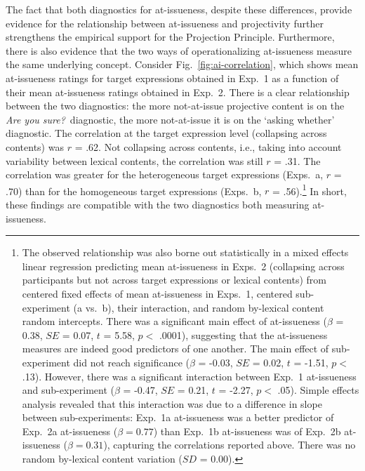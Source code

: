 \documentclass[11pt,fleqn]{article}
\newcommand{\6}{\mbox{$[\hspace*{-.6mm}[$}}
\newcommand{\9}{\mbox{$]\hspace*{-.6mm}]$}}
\newcommand{\figref}[1]{Fig.~\ref{#1}}
\begin{document}
The fact that both diagnostics for at-issueness, despite these differences, provide evidence for the relationship between at-issueness and projectivity  further strengthens the empirical support for the Projection Principle. Furthermore, there is also evidence that the two ways of operationalizing at-issueness measure the same underlying concept. Consider \figref{fig:ai-correlation}, which shows mean at-issueness ratings for target expressions obtained in Exp.~1 as a function of their mean at-issueness ratings obtained in Exp.~2. There is a clear relationship between the two diagnostics: the more not-at-issue projective content is on the {\em Are you sure?}~diagnostic, the more not-at-issue it is on the `asking whether' diagnostic. The correlation at the target expression level (collapsing across contents) was $r$ = .62. Not collapsing across contents, i.e., taking into account variability between lexical contents, the correlation was still $r$ = .31. The correlation was greater for the heterogeneous target expressions (Exps.~a, $r$ = .70) than for the homogeneous target expressions (Exps.~b, $r$ = .56).\footnote{The observed relationship was also borne out statistically in a mixed effects linear regression predicting mean at-issueness in Exps.~2 (collapsing across participants but not across target expressions or lexical contents) from centered fixed effects of mean at-issueness in Exps.~1, centered sub-experiment (a vs.~b), their interaction, and random by-lexical content random intercepts. There was a significant main effect of at-issueness ($\beta$ = 0.38, $SE$ = 0.07, $t$ = 5.58, $p <$ .0001), suggesting that the at-issueness measures are indeed good predictors of one another. The main effect of sub-experiment did not reach significance  ($\beta$ = -0.03, $SE$ = 0.02, $t$ = -1.51, $p <$ .13). However, there was a significant interaction between Exp.~1 at-issueness and sub-experiment ($\beta$ = -0.47, $SE$ = 0.21, $t$ = -2.27, $p <$ .05). Simple effects analysis revealed that this interaction was due to a difference in slope between sub-experiments: Exp.~1a at-issueness was a better predictor of Exp.~2a at-issueness ($\beta = 0.77$) than Exp.~1b at-issueness was of Exp.~2b at-issueness ($\beta = 0.31$), capturing the correlations reported above. There was no random by-lexical content variation  ($SD$ = 0.00).} In short, these findings are compatible with the two diagnostics both measuring at-issueness.
\end{document}

